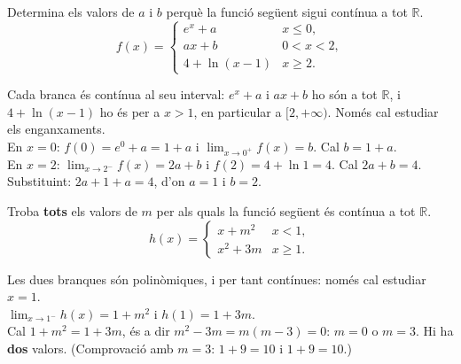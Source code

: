 \begin{apartats}

Determina els valors de $a$ i $b$ perquè la funció següent sigui contínua a tot $\mathbb{R}$.
\[
f(x)=\begin{cases}
  e^{x}+a & \si{x\le 0},\\[3pt]
  ax+b & \si{0<x<2},\\[3pt]
  4+\ln(x-1) & \si{x\ge 2}.
\end{cases}
\]

\begin{solucio}
Cada branca és contínua al seu interval: $e^x+a$ i $ax+b$ ho són a tot $\mathbb{R}$, i
$4+\ln(x-1)$ ho és per a $x>1$, en particular a $[2,+\infty)$. Només cal estudiar els
enganxaments.\\
En $x=0$: $f(0)=e^0+a=1+a$ i $\lim_{x\to0^+}f(x)=b$. Cal $b=1+a$.\\
En $x=2$: $\lim_{x\to2^-}f(x)=2a+b$ i $f(2)=4+\ln1=4$. Cal $2a+b=4$.\\
Substituint: $2a+1+a=4$, d'on $\boxed{a=1}$ i $\boxed{b=2}$.
\end{solucio}

Troba \textbf{tots} els valors de $m$ per als quals la funció següent és contínua a tot
$\mathbb{R}$.
\[
h(x)=\begin{cases}
  x+m^2 & \si{x<1},\\[3pt]
  x^2+3m & \si{x\ge 1}.
\end{cases}
\]

\begin{solucio}
Les dues branques són polinòmiques, i per tant contínues: només cal estudiar $x=1$.\\
$\lim_{x\to1^-}h(x)=1+m^2$ i $h(1)=1+3m$.\\
Cal $1+m^2=1+3m$, és a dir $m^2-3m=m(m-3)=0$: $\boxed{m=0}$ o $\boxed{m=3}$.
Hi ha \textbf{dos} valors. (Comprovació amb $m=3$: $1+9=10$ i $1+9=10$.)
\end{solucio}

\end{apartats}
